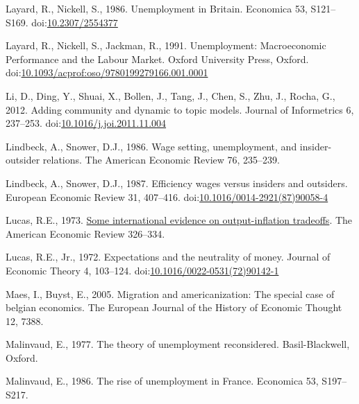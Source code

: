 \documentclass[
]{article}
\newlength{\cslhangindent}
\newlength{\cslentryspacingunit} %
\newenvironment{CSLReferences}[2] %
 {%
  \setlength{\parindent}{0pt}
  \ifodd #1
  \let\oldpar\par
  \def\par{\hangindent=\cslhangindent\oldpar}
  \fi
  \setlength{\parskip}{#2\cslentryspacingunit}
 }%
 {}
\begin{document}
\begin{CSLReferences}{1}{0}
\leavevmode{}%
Layard, R., Nickell, S., 1986. Unemployment in {Britain}. Economica 53,
S121--S169. doi:\href{https://doi.org/10.2307/2554377}{10.2307/2554377}

\leavevmode{}%
Layard, R., Nickell, S., Jackman, R., 1991. Unemployment: {Macroeconomic
Performance} and the {Labour Market}. {Oxford University Press},
{Oxford}.
doi:\href{https://doi.org/10.1093/acprof:oso/9780199279166.001.0001}{10.1093/acprof:oso/9780199279166.001.0001}

\leavevmode{}%
Li, D., Ding, Y., Shuai, X., Bollen, J., Tang, J., Chen, S., Zhu, J.,
Rocha, G., 2012. Adding community and dynamic to topic models. Journal
of Informetrics 6, 237--253.
doi:\href{https://doi.org/10.1016/j.joi.2011.11.004}{10.1016/j.joi.2011.11.004}

\leavevmode{}%
Lindbeck, A., Snower, D.J., 1986. Wage setting, unemployment, and
insider-outsider relations. The American Economic Review 76, 235--239.

\leavevmode{}%
Lindbeck, A., Snower, D.J., 1987. Efficiency wages versus insiders and
outsiders. European Economic Review 31, 407--416.
doi:\href{https://doi.org/10.1016/0014-2921(87)90058-4}{10.1016/0014-2921(87)90058-4}

\leavevmode{}%
Lucas, R.E., 1973. \href{http://www.jstor.org/stable/1914364}{Some
international evidence on output-inflation tradeoffs}. The American
Economic Review 326--334.

\leavevmode{}%
Lucas, R.E., Jr., 1972. Expectations and the neutrality of money.
Journal of Economic Theory 4, 103--124.
doi:\href{https://doi.org/10.1016/0022-0531(72)90142-1}{10.1016/0022-0531(72)90142-1}

\leavevmode{}%
Maes, I., Buyst, E., 2005. Migration and americanization: The special
case of belgian economics. The European Journal of the History of
Economic Thought 12, 7388.

\leavevmode{}%
Malinvaud, E., 1977. The theory of unemployment reconsidered.
{Basil-Blackwell}, {Oxford}.

\leavevmode{}%
Malinvaud, E., 1986. The rise of unemployment in {France}. Economica 53,
S197--S217.


\end{CSLReferences}
\end{document}
